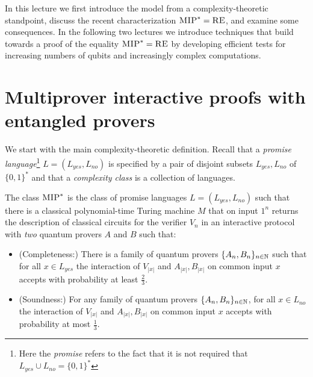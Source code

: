 In this lecture we first introduce the model from a complexity-theoretic standpoint, discuss the recent characterization $\textsc{MIP}^*=\textsc{RE}$, and examine some consequences. In the following two lectures we introduce techniques that build towards a proof of the equality $\textsc{MIP}^*=\textsc{RE}$ by developing efficient tests for  increasing numbers of qubits and increasingly complex computations. 


\section{Multiprover interactive proofs  with entangled provers}

We start with the main complexity-theoretic definition. Recall that a \emph{promise language}\footnote{Here the \emph{promise} refers to the fact that it is not required that $L_{yes}\cup L_{no} = \{0,1\}^*$}  $L=(L_{yes},L_{no})$ is specified by a pair of disjoint subsets $L_{yes},L_{no}$ of $\{0,1\}^*$ and that a \emph{complexity class} is a collection of languages. 

\begin{definition} \label{def:mipstar}
The class $\textsc{MIP}^*$ is the class of promise languages $L = (L_{yes}, L_{no})$ such that there is a classical polynomial-time Turing machine $M$ that on input $1^n$ returns the description of classical circuits for the verifier $V_n$ in an interactive protocol with \emph{two} quantum provers $A$ and $B$ such that: 
\begin{itemize}
\item (Completeness:) There is a family of quantum provers $\{A_n,B_n\}_{n\in \mathbb{N}}$ 
such that for all $x\in L_{yes}$ the interaction of $V_{|x|}$ and $A_{|x|}, B_{|x|}$ on common input $x$ accepts with probability at least $\frac{2}{3}$.
\item (Soundness:) For any family of quantum provers $\{A_n,B_n\}_{n\in \mathbb{N}}$, for all $x\in L_{no}$ the interaction of $V_{|x|}$ and $A_{|x|},B_{|x|}$ on common input $x$ accepts with probability at most $\frac{1}{3}$.
\end{itemize}
\end{definition}


